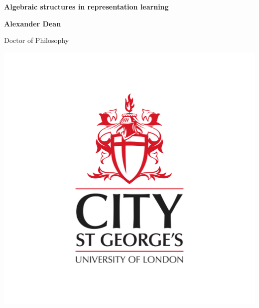 \begin{titlepage}
\thispagestyle{empty}
\begin{fullwidth}
    \begin{center}
        \vspace*{2mm}
        
        \begin{spacing}{1.2}
        \Huge
        \textbf{Algebraic structures in representation learning}
 		\end{spacing}
        
        \vspace{1cm}
        \Large
        \textbf{Alexander Dean}

        \vspace{1.5cm}
        
        \begin{spacing}{1}
        Doctor of Philosophy\\
        \end{spacing}
        
        \vspace{0cm} 
		
	    \includegraphics[width=\textwidth]{Frontmatter/Images/City_St_Georges_Logo_Primary_RGB.png}
	    

\end{center}
\end{fullwidth}
\end{titlepage}
